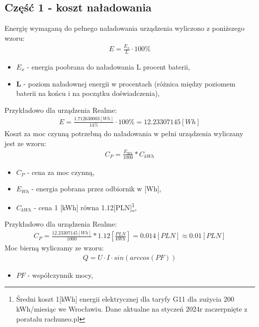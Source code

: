 \documentclass[11pt]{article}
\begin{document}
    \subsection*{Część 1 - koszt naładowania}
    Energię wymaganą do pełnego naładowania urządzenia wyliczono z poniższego wzoru:
    \begin{gather*}
        E=\frac{E_x}{L}\cdot 100\%
    \end{gather*}
    {\footnotesize
        \begin{itemize}
            \setlength\itemsep{0em}
            \item[] \textbf{$E_x$} - energia poobrana do naładowania L procent baterii,
            \item[] \textbf{L} - poziom naładownej energii w procentach (różnica między poziomem baterii na końcu i na początku doświadczenia),
        \end{itemize}}
    \noindent Przykładowo dla urządzenia Realme:
    \begin{gather*}
        E=\frac{1.712630003[Wh]}{14\%}\cdot 100\%=12.23307145[Wh]
    \end{gather*}
    \noindent Koszt za moc czynną potrzebną do naładowania w pełni urządzenia wyliczany jest ze wzoru:
    \begin{gather*}
        C_P=\frac{E_{Wh}}{1000}*C_{kWh}
    \end{gather*}
    {\footnotesize
        \begin{itemize}
            \setlength\itemsep{0em}
            \item[] \textbf{$C_P$} - cena za moc czynną,
            \item[] \textbf{$E_{Wh}$} - energia pobrana przez odbiornik w [Wh],
            \item[] \textbf{$C_{kWh}$} - cena 1 [kWh] równa 1.12[PLN]\footnote{Średni koszt 1[kWh] energii elektrycznej dla taryfy G11 dla zużycia 200 kWh/miesiąc we Wrocławiu. Dane aktualne na styczeń 2024r zaczerpnięte z poratalu rachuneo.pl},
        \end{itemize}}
    \noindent Przykładowo dla urządzenia Realme:
    \begin{gather*}
        C_P=\frac{12.23307145[Wh]}{1000}*1.12[\frac{PLN}{kWh}]=0.014[PLN]\approx 0.01[PLN]
    \end{gather*}
    \newpage
    \noindent Moc bierną wyliczamy ze wzoru:
    \begin{gather*}
        Q=U\cdot I\cdot sin(arccos(PF))
    \end{gather*}
    {\footnotesize
        \begin{itemize}
            \setlength\itemsep{0em}
            \item[] \textbf{$PF$} - współczynnik mocy,
        \end{itemize}}
\end{document}
